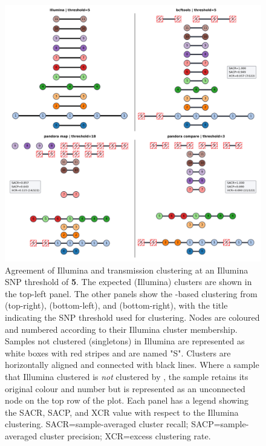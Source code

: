 \begin{figure}
\begin{center}
\includegraphics[width=0.90\columnwidth]{Chapter2/Figs/clustering-t5.png}
\caption{{Agreement of Illumina and \ont{} transmission clustering at an Illumina SNP threshold of \textbf{5}. The expected (Illumina) clusters are shown in the top-left panel. The other panels show the \ont{}-based clustering from \bcftools{} (top-right), \map{} (bottom-left), and \compare{} (bottom-right), with the title indicating the SNP threshold used for clustering. Nodes are coloured and numbered according to their Illumina cluster membership. Samples not clustered (singletons) in Illumina are represented as white boxes with red stripes and are named "S". Clusters are horizontally aligned and connected with black lines. Where a sample that Illumina clustered is \emph{not} clustered by \ont{}, the sample retains its original colour and number but is represented as an unconnected node on the top row of the plot. Each \ont{} panel has a legend showing the SACR, SACP, and XCR value with respect to the Illumina clustering. SACR=sample-averaged cluster recall; SACP=sample-averaged cluster precision; XCR=excess clustering rate.
{\label{fig:clustering-t5}}
}}
\end{center}
\end{figure}

